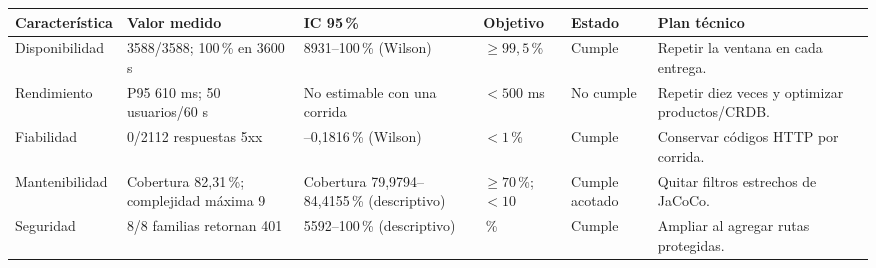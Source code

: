 \begin{tabularx}{\textwidth}{>{\raggedright\arraybackslash}p{1.8cm} X >{\raggedright\arraybackslash}p{2.3cm} >{\raggedright\arraybackslash}p{1.5cm} >{\raggedright\arraybackslash}p{1.5cm} X}
\toprule
Caracterís\-tica & Valor medido & IC 95\,\% & Objetivo & Estado & Plan técnico \\
\midrule
Disponibi\-lidad & 3588/3588; 100\,\% en 3600 s & 99{,}8931--100\,\% (Wilson) & $\geq99{,}5$\,\% & Cumple & Repetir la ventana en cada entrega. \\
Rendimiento & P95 610 ms; 50 usuarios/60 s & No estimable con una corrida & $<500$ ms & No cumple & Repetir diez veces y optimizar productos/CRDB. \\
Fiabilidad & 0/2112 respuestas 5xx & 0--0{,}1816\,\% (Wilson) & $<1$\,\% & Cumple & Conservar códigos HTTP por corrida. \\
Manteni\-bilidad & Cobertura 82{,}31\,\%; complejidad máxima 9 & Cobertura 79{,}9794--84{,}4155\,\% (descriptivo) & $\geq70$\,\%; $<10$ & Cumple acotado & Quitar filtros estrechos de JaCoCo. \\
Seguridad & 8/8 familias retornan 401 & 67{,}5592--100\,\% (descriptivo) & 100\,\% & Cumple & Ampliar al agregar rutas protegidas. \\
\bottomrule
\end{tabularx}
